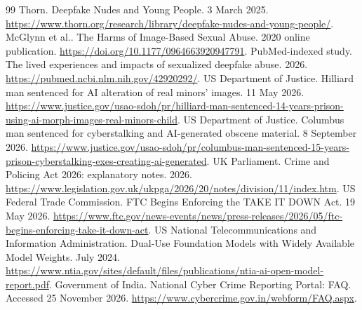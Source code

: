 \documentclass[10pt,a4paper]{article}
\begin{document}
\begin{thebibliography}{99}
 Thorn. Deepfake Nudes and Young People. 3 March 2025. \url{https://www.thorn.org/research/library/deepfake-nudes-and-young-people/}.
 McGlynn et al.. The Harms of Image-Based Sexual Abuse. 2020 online publication. \url{https://doi.org/10.1177/0964663920947791}.
 PubMed-indexed study. The lived experiences and impacts of sexualized deepfake abuse. 2026. \url{https://pubmed.ncbi.nlm.nih.gov/42920292/}.
 US Department of Justice. Hilliard man sentenced for AI alteration of real minors' images. 11 May 2026. \url{https://www.justice.gov/usao-sdoh/pr/hilliard-man-sentenced-14-years-prison-using-ai-morph-images-real-minors-child}.
 US Department of Justice. Columbus man sentenced for cyberstalking and AI-generated obscene material. 8 September 2026. \url{https://www.justice.gov/usao-sdoh/pr/columbus-man-sentenced-15-years-prison-cyberstalking-exes-creating-ai-generated}.
 UK Parliament. Crime and Policing Act 2026: explanatory notes. 2026. \url{https://www.legislation.gov.uk/ukpga/2026/20/notes/division/11/index.htm}.
 US Federal Trade Commission. FTC Begins Enforcing the TAKE IT DOWN Act. 19 May 2026. \url{https://www.ftc.gov/news-events/news/press-releases/2026/05/ftc-begins-enforcing-take-it-down-act}.
 US National Telecommunications and Information Administration. Dual-Use Foundation Models with Widely Available Model Weights. July 2024. \url{https://www.ntia.gov/sites/default/files/publications/ntia-ai-open-model-report.pdf}.
 Government of India. National Cyber Crime Reporting Portal: FAQ. Accessed 25 November 2026. \url{https://www.cybercrime.gov.in/webform/FAQ.aspx}.
\end{thebibliography}
\end{document}
